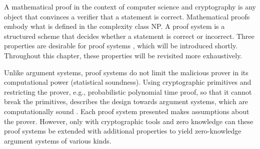 A mathematical proof in the context of computer science and cryptography is any object that convinces a verifier that a statement is correct. Mathematical proofs embody what is defined in the complexity class NP. A proof system is a structured scheme that decides whether a statement is correct or incorrect. Three properties are desirable for proof systems \citep{GoldwasserIPs}, which will be introduced shortly. Throughout this chapter, these properties will be revisited more exhaustively.
\begin{itemize}
\end{itemize}
Unlike argument systems, proof systems do not limit the malicious prover in its computational power (statistical soundness). Using cryptographic primitives and restricting the prover, e.g., probabilistic polynomial time proof, so that it cannot break the primitives, describes the design towards argument systems, which are computationally sound \citep{ArgSystems, MicaliArgSys}. Each proof system presented makes assumptions about the prover. However, only with cryptographic tools and zero knowledge can these proof systems be extended with additional properties to yield zero-knowledge argument systems of various kinds.


